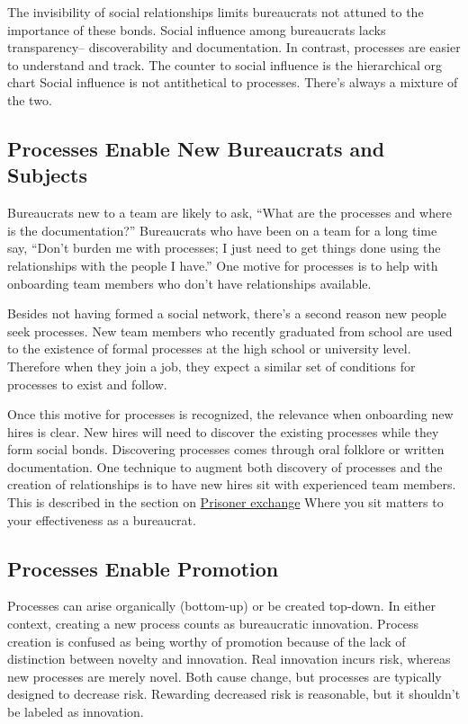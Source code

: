 The invisibility of social relationships limits bureaucrats not attuned to the importance of these bonds. 
Social influence among bureaucrats lacks transparency-- discoverability and documentation. 
In contrast, processes are easier to understand and track. The counter to social influence is the hierarchical  \iftoggle{glossaryinmargin}{\marginpar{[Glossary]}}{}
\gls{org chart}\iftoggle{haspagenumbers}{ described on page~\pageref{sec:org-chart-as-guide-and-lie}.}{.}
Social influence is not antithetical to processes. There's always a mixture of the two.


\subsection*{Processes Enable New Bureaucrats and Subjects}

Bureaucrats new to a team are likely to ask, ``What are the processes and where is the documentation?'' Bureaucrats who have been on a team for a long time say, ``Don't burden me with processes; I just need to get things done using the relationships with the people I have.'' One motive for processes is to help with onboarding team members who don't have relationships available.

Besides not having formed a social network, there's a second reason new people seek processes. New team members who recently graduated from school are used to the existence of formal processes at the high school or university level. Therefore when they join a job, they expect a similar set of conditions for processes to exist and follow.

Once this motive for processes is recognized, the relevance when onboarding new hires is clear. New hires will need to discover the existing processes while they form social bonds. Discovering processes comes through oral folklore or written documentation. One technique to augment both discovery of processes  and the creation of relationships is to have new hires sit with experienced team members.
This is described in the section on  
\hyperref[sec:prisoner-exchange]{Prisoner exchange}\iftoggle{haspagenumbers}{ on page~\pageref{sec:prisoner-exchange}.}{.}
Where you sit matters to your effectiveness as a bureaucrat.

\subsection*{Processes Enable Promotion}

Processes can arise organically (bottom-up) or be created top-down. In either context, creating a new process counts as bureaucratic innovation. Process creation is confused as being worthy of promotion because of the lack of distinction between novelty and innovation. Real innovation incurs risk, whereas new processes are merely novel. Both cause change, but processes are typically designed to decrease risk. Rewarding decreased risk is reasonable, but it shouldn't be labeled as innovation.

